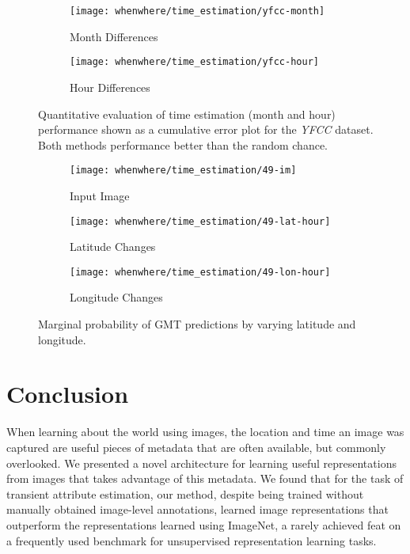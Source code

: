 \begin{figure}
  \centering
  
  \begin{subfigure}[b]{0.45\linewidth}
    \texttt{[image: whenwhere/time\_estimation/yfcc-month]}
    \caption{Month Differences}
  \end{subfigure}
  \begin{subfigure}[b]{0.45\linewidth}
    \texttt{[image: whenwhere/time\_estimation/yfcc-hour]}
    \caption{Hour Differences}
  \end{subfigure}
  
  \caption{Quantitative evaluation of time estimation (month and hour)
  performance shown as a cumulative error plot for the {\em YFCC}
dataset. Both methods performance better than the random chance.}
  
  \label{fig:time_diff_err}
\end{figure}

\begin{figure}
  \centering
  
  \begin{subfigure}[b]{.215\linewidth}
    \texttt{[image: whenwhere/time\_estimation/49-im]}
    \caption{Input Image}
  \end{subfigure}
  \hspace{.25cm}
  \begin{subfigure}[b]{.33\linewidth}
    \texttt{[image: whenwhere/time\_estimation/49-lat-hour]}
    \caption{Latitude Changes}
  \end{subfigure}
  \begin{subfigure}[b]{.338\linewidth}
    \texttt{[image: whenwhere/time\_estimation/49-lon-hour]}
    \caption{Longitude Changes}
  \end{subfigure}

  \caption{Marginal probability of GMT predictions by varying latitude
  and longitude.}
  
  \label{fig:hour-change}
\end{figure}


\section{Conclusion}

When learning about the world using images, the location and time an
image was captured are useful pieces of metadata that are often
available, but commonly overlooked. We presented a novel architecture
for learning useful representations from images that takes advantage
of this metadata. We found that for the task of transient attribute
estimation, our method, despite being trained without manually
obtained image-level annotations, learned image representations that
outperform the representations learned using ImageNet, a rarely
achieved feat on a frequently used benchmark for unsupervised
representation learning tasks.
